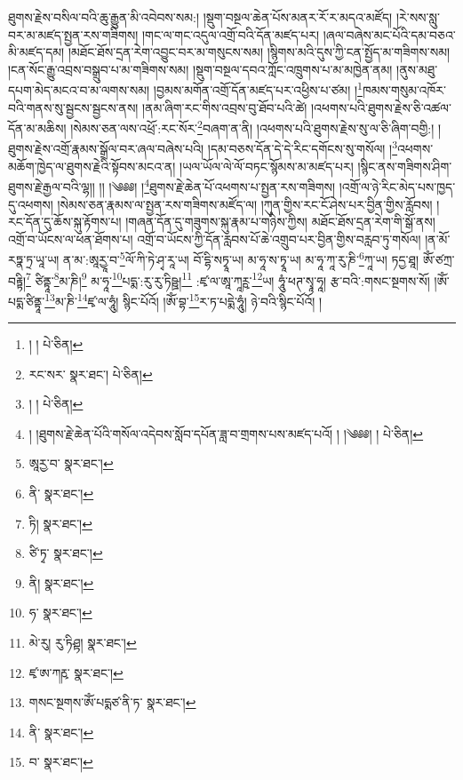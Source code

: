 ཐུགས་རྗེས་བསིལ་བའི་ཆུ་རྒྱུན་མི་འབེབས་སམ:། །སྡུག་བསྔལ་ཆེན་པོས་མནར་རོ་ར་མདའ་མཛོད། །རེ་སས་སླུ་བར་མ་མཛད་སྤྱན་རས་གཟིགས། །གང་ལ་གང་འདུལ་འགྲོ་བའི་དོན་མཛད་པར། །ཞལ་བཞེས་མང་པོའི་དམ་བཅའ་མི་མཛད་དམ། །མཐོང་ཐོས་དྲན་རེག་འབྱུང་བར་མ་གསུངས་སམ། །སྙིགས་མའི་དུས་ཀྱི་ངན་སྤྱོད་མ་གཟིགས་སམ། །ངན་སོང་རྒྱུ་འབྲས་བསྒྲུབ་པ་མ་གཟིགས་སམ། །སྡུག་བསྔལ་དབའ་ཀློང་འཁྲུགས་པ་མ་མཁྱེན་ནམ། །ནུས་མཐུ་དཔག་མེད་མངའ་བ་མ་ལགས་སམ། །བྱམས་མགོན་འགྲོ་དོན་མཛད་པར་འཕྱིས་པ་ཙམ། །\footnote{། །  པེ་ཅིན། }ཁམས་གསུམ་འཁོར་བའི་གནས་སུ་སྦྱངས་སྦྱངས་ནས། །ནམ་ཞིག་རང་གིས་འབྲས་བུ་ཐོབ་པའི་ཚེ། །འཕགས་པའི་ཐུགས་རྗེས་ཅི་འཚལ་དོན་མ་མཆིས། །སེམས་ཅན་ལས་འཕྲོ་:རང་སོར་\footnote{རང་སར་  སྣར་ཐང་།  པེ་ཅིན། }བཞག་ན་ནི། །འཕགས་པའི་ཐུགས་རྗེས་སུ་ལ་ཅི་ཞིག་བགྱི:། །ཐུགས་རྗེས་འགྲོ་རྣམས་སྒྲོལ་བར་ཞལ་བཞེས་པའི། །དམ་བཅས་དོན་དེ་དེ་རིང་དགོངས་སུ་གསོལ། །\footnote{། །  པེ་ཅིན། }འཕགས་མཆོག་ཁྱེད་ལ་ཐུགས་རྗེའི་སྟོབས་མངའ་ན། །ཡལ་ཡོལ་ལེ་ལོ་བཏང་སྙོམས་མ་མཛད་པར། །སྙིང་ནས་གཟིགས་ཤིག་ཐུགས་རྗེ་རྒྱལ་བའི་ལྷ།། །། །༄༅༅། །\footnote{། །ཐུགས་རྗེ་ཆེན་པོའི་གསོལ་འདེབས་སློབ་དཔོན་ཟླ་བ་གྲགས་པས་མཛད་པའོ། ། །༄༅༅། །  པེ་ཅིན། }ཐུགས་རྗེ་ཆེན་པོ་འཕགས་པ་སྤྱན་རས་གཟིགས། །འགྲོ་ལ་ཉེ་རིང་མེད་པས་ཁྱད་དུ་འཕགས། །སེམས་ཅན་རྣམས་ལ་སྤྱན་རས་གཟིགས་མཛོད་ལ། །ཀུན་གྱིས་རང་ངོ་ཤེས་པར་བྱིན་གྱིས་རློབས། །རང་དོན་དུ་ཆོས་སྐུ་རྟོགས་པ། །གཞན་དོན་དུ་གཟུགས་སྐུ་རྣམ་པ་གཉིས་ཀྱིས། མཐོང་ཐོས་དྲན་རེག་གི་སྒོ་ནས། འགྲོ་བ་ཡོངས་ལ་ཕན་ཐོགས་པ། འགྲོ་བ་ཡོངས་ཀྱི་དོན་རླབས་པོ་ཆེ་འགྲུབ་པར་བྱིན་གྱིས་བརླབ་ཏུ་གསོལ། །ན་མོ་རཏྣ་ཏྲ་ཡཱ་ཡ། ན་མ་:ཨཱརྱཱ་བ་\footnote{ཨཱརྱ་བ་  སྣར་ཐང་། }ལོ་ཀི་ཏེ་ཤྭ་རཱ་ཡ། བོ་དྷི་སཏྭཱ་ཡ། མ་ཧཱ་ས་ཏྭཱ་ཡ། མ་ཧཱ་ཀཱ་རུ་ཎི་\footnote{ནི་  སྣར་ཐང་། }ཀཱ་ཡ། ཏདྱ་ཐཱ། ཨོཾ་ཙཀྲ་བརྟྟི།\footnote{ཏི།  སྣར་ཐང་། } ཙིནྟཱ་\footnote{ཙི་ཏྭ་  སྣར་ཐང་། }མ་ཎི།\footnote{ནི།  སྣར་ཐང་། } མ་ཧཱ་\footnote{ཧ་  སྣར་ཐང་། }པདྨ་:རུ་རུ་ཏིཥྛ།\footnote{མེ་རུ། རུ་ཏིཤྟ།  སྣར་ཐང་། } :ཛྭ་ལ་ཨཱ་ཀཱཪྵ་\footnote{ཛྭ་ཨ་ཀརྵ་  སྣར་ཐང་། }ཡ། ཧཱུཾ་ཕཊ་སྭཱ་ཧཱ། རྩ་བའི་:གསང་སྔགས་སོ། །ཨོཾ་པདྨ་ཙིནྟཱ་\footnote{གསང་སྔགས་ཨོཾ་པདྨཙ་ནི་ཏ་  སྣར་ཐང་། }མ་ཎི་\footnote{ནི་  སྣར་ཐང་། }ཛྭ་ལ་ཧཱུཾ། སྙིང་པོའོ། །ཨོཾ་བྷ་\footnote{བ་  སྣར་ཐང་། }ར་ཏ་པདྨེ་ཧཱུཾ། ཉེ་བའི་སྙིང་པོའོ། ། 